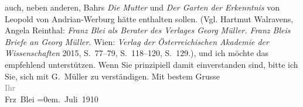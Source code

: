 \begin{ledgroupsized}[t]{13cm}
{{{                  auch, neben anderen, Bahrs \emph{Die Mutter} und \emph{Der Garten der
                     Erkenntnis} von Leopold von
                     Andrian-Werburg hätte enthalten sollen. (Vgl. Hartmut Walravens,
                     Angela Reinthal: \emph{Franz Blei als Berater des Verlages Georg
                        Müller. Franz Bleis Briefe an Georg Müller}. Wien: \emph{Verlag
                        der Österreichischen Akademie der Wissenschaften}{ }2015, S. 77–79, S. 118–120, S. 129.)}}}\label{K_L01943_1h}, und ich möchte
               das empfehlend unterstützen. Wenn Sie prinzipiell damit einverstanden sind, bitte ich
               Sie, sich mit G. Müller zu verständigen.\pend
           \pstart
           Mit bestem Grusse{\\[\baselineskip]}\textcolor{gray}{Ihr}{\\[\baselineskip]}\spacefill\mbox{Frz Blei}\pend
           \leftskip=0em{}. Juli 1910\pend
           
         
         \endnumbering{}\end{ledgroupsized}  \newcommand{\dateiname}{L01943}\newcommand{\titel}{Franz Blei an Arthur Schnitzler, 10. 7. 1910}\newcommand{\editorInnen}{Martin Anton Müller und Gerd-Hermann Susen}
      